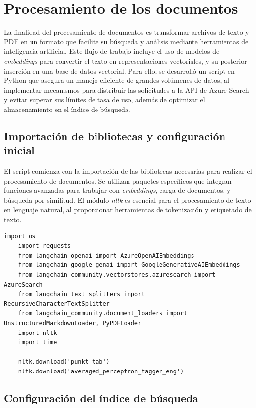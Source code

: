 \section{Procesamiento de los documentos}

La finalidad del procesamiento de documentos es transformar archivos de texto y PDF en un formato que facilite su búsqueda y análisis mediante 
herramientas de inteligencia artificial. Este flujo de trabajo incluye el uso de modelos de \textit{embeddings} para convertir el texto en 
representaciones vectoriales, y su posterior inserción en una base de datos vectorial. Para ello, se desarrolló un script en Python que asegura 
un manejo eficiente de grandes volúmenes de datos, al implementar mecanismos para distribuir las solicitudes a la API de Azure Search y evitar 
superar sus límites de tasa de uso, además de optimizar el almacenamiento en el índice de búsqueda.

\subsection{Importación de bibliotecas y configuración inicial}

El script comienza con la importación de las bibliotecas necesarias para realizar el procesamiento de documentos. Se utilizan paquetes específicos 
que integran funciones avanzadas para trabajar con \textit{embeddings}, carga de documentos, y búsqueda por similitud. El módulo \textit{nltk} es esencial 
para el procesamiento de texto en lenguaje natural, al proporcionar herramientas de tokenización y etiquetado de texto.

\begin{lstlisting}[label=cod:update-db-1,caption=Importación de bibliotecas y configuración inicial.]
	import os
	import requests
	from langchain_openai import AzureOpenAIEmbeddings
	from langchain_google_genai import GoogleGenerativeAIEmbeddings
	from langchain_community.vectorstores.azuresearch import AzureSearch
	from langchain_text_splitters import RecursiveCharacterTextSplitter
	from langchain_community.document_loaders import UnstructuredMarkdownLoader, PyPDFLoader
	import nltk
	import time

	nltk.download('punkt_tab')
	nltk.download('averaged_perceptron_tagger_eng')
\end{lstlisting}

\subsection{Configuración del índice de búsqueda}


